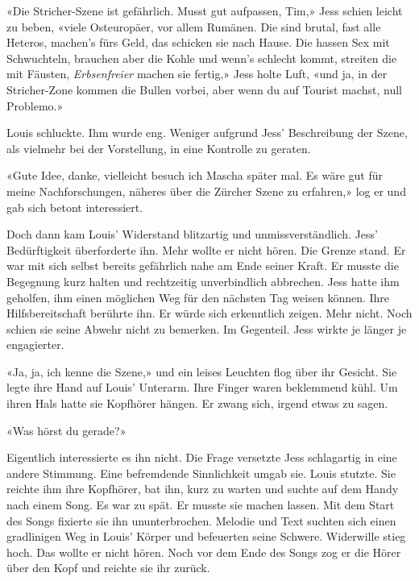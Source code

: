 «Die Stricher-Szene ist gefährlich. Musst gut aufpassen, Tim,» Jess
schien leicht zu beben, «viele Osteuropäer, vor allem Rumänen. Die sind
brutal, fast alle Heteros, machen’s fürs Geld, das schicken sie nach
Hause. Die hassen Sex mit Schwuchteln, brauchen aber die Kohle und
wenn’s schlecht kommt, streiten die mit Fäusten, \emph{Erbsenfreier}
machen sie fertig,» Jess holte Luft, «und ja, in der Stricher-Zone
kommen die Bullen vorbei, aber wenn du auf Tourist machst, null
Problemo.»

Louis schluckte. Ihm wurde eng. Weniger aufgrund Jess’ Beschreibung der
Szene, als vielmehr bei der Vorstellung, in eine Kontrolle zu geraten.

«Gute Idee, danke, vielleicht besuch ich Mascha später mal. Es wäre gut
für meine Nachforschungen, näheres über die Zürcher Szene zu erfahren,»
log er und gab sich betont interessiert.

Doch dann kam Louis’ Widerstand blitzartig und unmissverständlich. Jess’
Bedürftigkeit überforderte ihn. Mehr wollte er nicht hören.
Die Grenze stand.
Er war mit sich selbst bereits gefährlich nahe am Ende seiner Kraft. Er
musste die Begegnung kurz halten und rechtzeitig unverbindlich
abbrechen.
Jess hatte ihm geholfen, ihm einen möglichen Weg für den nächsten Tag
weisen können. Ihre Hilfsbereitschaft berührte ihn. Er würde sich
erkenntlich zeigen. Mehr nicht.
Noch schien sie seine Abwehr nicht zu bemerken. Im Gegenteil.
Jess wirkte je länger je engagierter.
 
«Ja, ja, ich kenne die Szene,» und ein leises Leuchten flog über ihr
Gesicht.
Sie legte ihre Hand auf Louis’ Unterarm. Ihre Finger waren beklemmend
kühl. Um ihren Hals hatte sie Kopfhörer hängen. 
Er zwang sich, irgend etwas zu sagen.

«Was hörst du gerade?»

Eigentlich interessierte es ihn nicht.
Die Frage versetzte Jess schlagartig in eine andere Stimmung. Eine
befremdende Sinnlichkeit umgab sie. Louis stutzte. Sie reichte ihm ihre
Kopfhörer, bat ihn, kurz zu warten und suchte auf dem Handy nach einem
Song.
Es war zu spät. Er musste sie machen lassen.
Mit dem Start des Songs fixierte sie ihn ununterbrochen. Melodie und Text suchten sich einen gradlinigen Weg in Louis’ Körper und
befeuerten seine Schwere. Widerwille stieg hoch. Das wollte er nicht
hören.
Noch vor dem Ende des Songs zog er die Hörer über den Kopf und reichte
sie ihr zurück.


